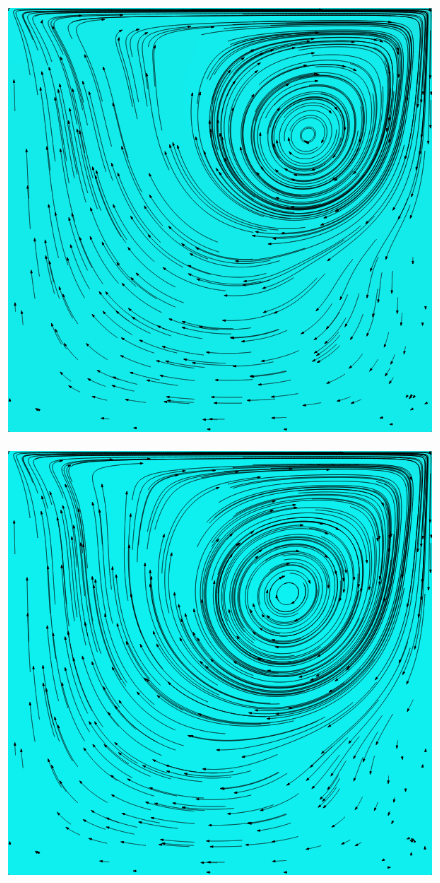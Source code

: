 		\begin{frame}
			\begin{figure}
				\centering
				\includegraphics[scale=0.4]{images/re-1000-512-04758.png}
			\end{figure}
		\end{frame}

		\begin{frame}
			\begin{figure}
				\centering
				\includegraphics[scale=0.4]{images/re-1000-512-06482.png}
			\end{figure}
		\end{frame}

